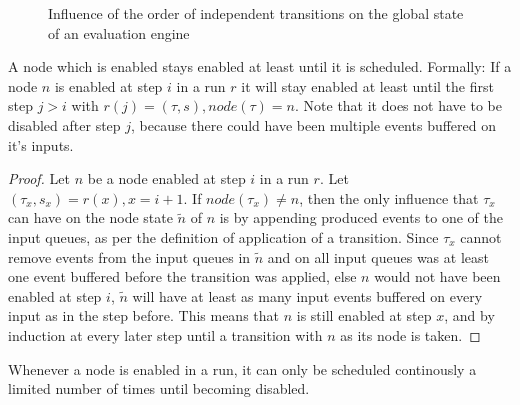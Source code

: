 \begin{figure}
  \caption{Influence of the order of independent transitions on the global state of an evaluation engine}
\label{fig:chap4:sec_run:exchange_transitions}
\end{figure}

\begin{lemma}[name = Duration of Enabledness]\label{lemma:enabled_till_scheduled}
  A node which is enabled stays enabled at least until it is scheduled.
  Formally: If a node \(n\) is enabled at step \(i\) in a run \(r\) it will stay enabled at least until the first step \(j > i\) with \(r(j) = (\tau,s), \mathit{node}(\tau) = n\).
  Note that it does not have to be disabled after step \(j\), because there could have been multiple events buffered on it's inputs.
\end{lemma}

\begin{proof}
  Let \(n\) be a node enabled at step \(i\) in a run \(r\).
  Let \((\tau_x,s_x) = r(x), x = i + 1\).
  If \(\mathit{node}(\tau_x) \neq n\), then the only influence that \(\tau_x\) can have on the node state \(\widetilde{n}\) of \(n\) is by appending produced events to one of the input queues, as per the definition of application of a transition.
  Since \(\tau_x\) cannot remove events from the input queues in \(\widetilde{n}\) and on all input queues was at least one event buffered before the transition was applied, else \(n\) would not have been enabled at step \(i\), \(\widetilde{n}\) will have at least as many input events buffered on every input as in the step before.
  This means that \(n\) is still enabled at step \(x\), and by induction at every later step until a transition with \(n\) as its node is taken.
\end{proof}

\begin{lemma}[name = Finiteness of Enabledness]\label{lemma:finiteness_enabledness}
  Whenever a node is enabled in a run, it can only be scheduled continously a limited number of times until becoming disabled.
\end{lemma}


